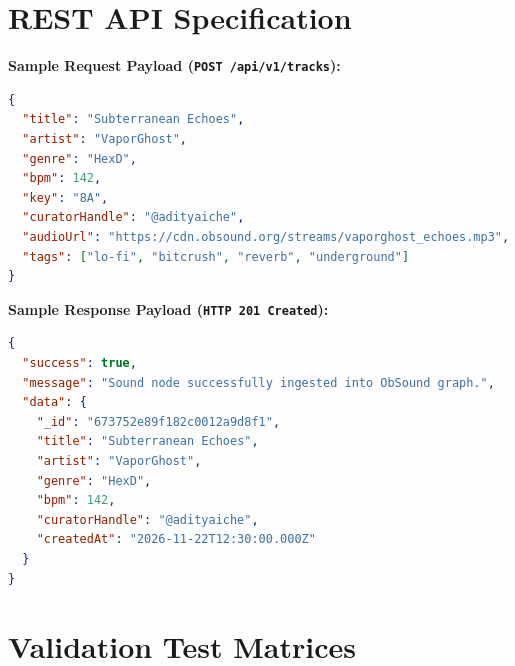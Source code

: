 \documentclass[12pt,a4paper,oneside]{report}
\begin{document}
\appendix
\chapter{REST API Specification}

\noindent \textbf{Sample Request Payload (\texttt{POST /api/v1/tracks}):}
\begin{lstlisting}[language=json]
{
  "title": "Subterranean Echoes",
  "artist": "VaporGhost",
  "genre": "HexD",
  "bpm": 142,
  "key": "8A",
  "curatorHandle": "@adityaiche",
  "audioUrl": "https://cdn.obsound.org/streams/vaporghost_echoes.mp3",
  "tags": ["lo-fi", "bitcrush", "reverb", "underground"]
}
\end{lstlisting}

\noindent \textbf{Sample Response Payload (\texttt{HTTP 201 Created}):}
\begin{lstlisting}[language=json]
{
  "success": true,
  "message": "Sound node successfully ingested into ObSound graph.",
  "data": {
    "_id": "673752e89f182c0012a9d8f1",
    "title": "Subterranean Echoes",
    "artist": "VaporGhost",
    "genre": "HexD",
    "bpm": 142,
    "curatorHandle": "@adityaiche",
    "createdAt": "2026-11-22T12:30:00.000Z"
  }
}
\end{lstlisting}

\chapter{Validation Test Matrices}
\end{document}
